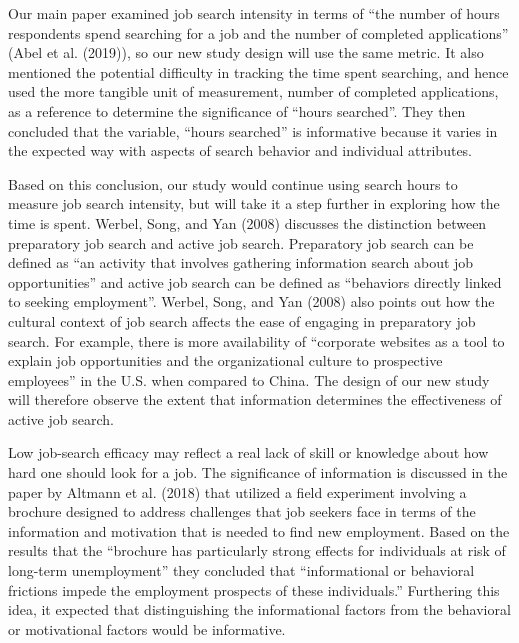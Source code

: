 \documentclass[]{elsarticle} %
\begin{document}
Our main paper examined job search intensity in terms of ``the number of
hours respondents spend searching for a job and the number of completed
applications'' (Abel et al. (2019)), so our new study design will use
the same metric. It also mentioned the potential difficulty in tracking
the time spent searching, and hence used the more tangible unit of
measurement, number of completed applications, as a reference to
determine the significance of ``hours searched''. They then concluded
that the variable, ``hours searched'' is informative because it varies
in the expected way with aspects of search behavior and individual
attributes.

Based on this conclusion, our study would continue using search hours to
measure job search intensity, but will take it a step further in
exploring how the time is spent. Werbel, Song, and Yan (2008) discusses
the distinction between preparatory job search and active job search.
Preparatory job search can be defined as ``an activity that involves
gathering information search about job opportunities'' and active job
search can be defined as ``behaviors directly linked to seeking
employment''. Werbel, Song, and Yan (2008) also points out how the
cultural context of job search affects the ease of engaging in
preparatory job search. For example, there is more availability of
``corporate websites as a tool to explain job opportunities and the
organizational culture to prospective employees'' in the U.S. when
compared to China. The design of our new study will therefore observe
the extent that information determines the effectiveness of active job
search.

Low job-search efficacy may reflect a real lack of skill or knowledge
about how hard one should look for a job. The significance of
information is discussed in the paper by Altmann et al. (2018) that
utilized a field experiment involving a brochure designed to address
challenges that job seekers face in terms of the information and
motivation that is needed to find new employment. Based on the results
that the ``brochure has particularly strong effects for individuals at
risk of long-term unemployment'' they concluded that ``informational or
behavioral frictions impede the employment prospects of these
individuals.'' Furthering this idea, it expected that distinguishing the
informational factors from the behavioral or motivational factors would
be informative.
\end{document}
